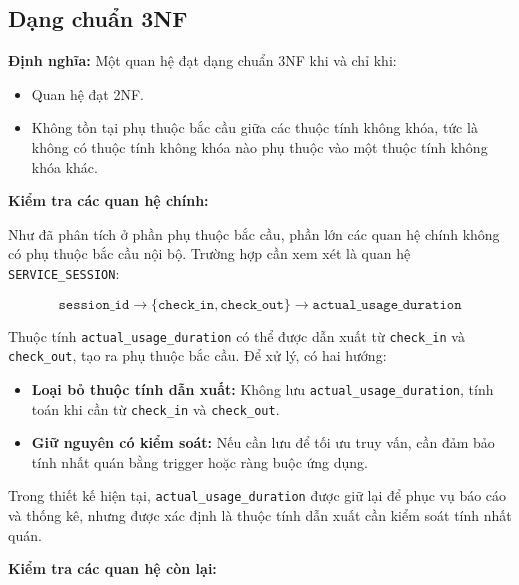 \subsection{Dạng chuẩn 3NF}

\textbf{Định nghĩa:} Một quan hệ đạt dạng chuẩn 3NF khi và chỉ khi:
\begin{itemize}
    \item Quan hệ đạt 2NF.
    \item Không tồn tại phụ thuộc bắc cầu giữa các thuộc tính không khóa, tức là không có thuộc tính không khóa nào phụ thuộc vào một thuộc tính không khóa khác.
\end{itemize}

\textbf{Kiểm tra các quan hệ chính:}

Như đã phân tích ở phần phụ thuộc bắc cầu, phần lớn các quan hệ chính không có phụ thuộc bắc cầu nội bộ. Trường hợp cần xem xét là quan hệ \texttt{SERVICE\_SESSION}:

$$\texttt{session\_id} \rightarrow \{\texttt{check\_in}, \texttt{check\_out}\} \rightarrow \texttt{actual\_usage\_duration}$$

Thuộc tính \texttt{actual\_usage\_duration} có thể được dẫn xuất từ \texttt{check\_in} và \texttt{check\_out}, tạo ra phụ thuộc bắc cầu. Để xử lý, có hai hướng:

\begin{itemize}
    \item \textbf{Loại bỏ thuộc tính dẫn xuất:} Không lưu \texttt{actual\_usage\_duration}, tính toán khi cần từ \texttt{check\_in} và \texttt{check\_out}.
    \item \textbf{Giữ nguyên có kiểm soát:} Nếu cần lưu để tối ưu truy vấn, cần đảm bảo tính nhất quán bằng trigger hoặc ràng buộc ứng dụng.
\end{itemize}

Trong thiết kế hiện tại, \texttt{actual\_usage\_duration} được giữ lại để phục vụ báo cáo và thống kê, nhưng được xác định là thuộc tính dẫn xuất cần kiểm soát tính nhất quán.

\textbf{Kiểm tra các quan hệ còn lại:}

